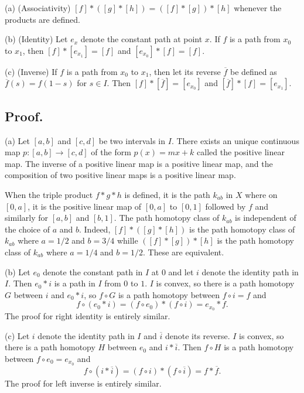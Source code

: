\documentclass[titlepage]{article}
\begin{document}
(a) (Associativity) $[f] * ([g] * [h]) = ([f] * [g]) * [h]$ whenever the products are defined.

(b) (Identity) Let $e_{x}$ denote the constant path at point $x$. If $f$ is a path from $x_{0}$ to $x_{1}$, then $[f] * [e_{x_{1}}] = [f]$ and $[e_{x_{0}}] * [f] = [f]$.

(c) (Inverse) If $f$ is a path from $x_{0}$ to $x_{1}$, then let its reverse $\overline{f}$ be defined as $\overline{f}(s) = f(1 - s)$ for $s \in I$. Then $[f] * [\overline{f}] = [e_{x_{0}}]$ and $[\overline{f}] * [f] = [e_{x_{1}}]$.

\subsection{Proof.}

(a) Let $[a, b]$ and $[c, d]$ be two intervals in $I$. There exists an unique continuous map $p: [a, b] \to [c, d]$ of the form $p(x) = mx + k$ called the positive linear map. The inverse of a positive linear map is a positive linear map, and the composition of two positive linear maps is a positive linear map.

When the triple product $f * g * h$ is defined, it is the path $k_{ab}$ in $X$ where on $[0, a]$, it is the positive linear map of $[0, a]$ to $[0, 1]$ followed by $f$ and similarly for $[a, b]$ and $[b, 1]$. The path homotopy class of $k_{ab}$ is independent of the choice of $a$ and $b$. Indeed, $[f] * ([g] * [h])$ is the path homotopy class of $k_{ab}$ where $a = 1/2$ and $b = 3/4$ whille $([f] * [g]) * [h]$ is the path homotopy class of $k_{ab}$ where $a = 1/4$ and $b = 1/2$. These are equivalent.

(b) Let $e_{0}$ denote the constant path in $I$ at $0$ and let $i$ denote the identity path in $I$. Then $e_{0} * i$ is a path in $I$ from $0$ to $1$. $I$ is convex, so there is a path homotopy $G$ between $i$ and $e_{0}*i$, so $f \circ G$ is a path homotopy between $f \circ i = f$ and 
$$f \circ (e_{0} * i) = (f \circ e_{0}) * (f \circ i) = e_{x_{0}} * f.$$
The proof for right identity is entirely similar.

(c) Let $i$ denote the identity path in $I$ and $\overline{i}$ denote its reverse. $I$ is convex, so there is a path homotopy $H$ between $e_{0}$ and $i * \overline{i}$. Then $f \circ H$ is a path homotopy between $f \circ e_{0} = e_{x_{0}}$ and 
$$f \circ (i * \overline{i}) = (f \circ i) * (f \circ \overline{i}) = f * \overline{f}.$$
The proof for left inverse is entirely similar.
\end{document}
